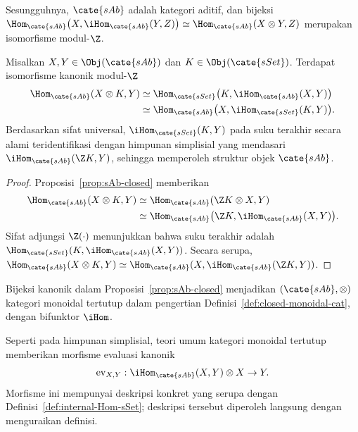 Sesungguhnya, $\cate{sAb}$ adalah kategori aditif, dan bijeksi
$\Hom_{\cate{sAb}}\bigl(X,\iHom_{\cate{sAb}}(Y,Z)\bigr)
\simeq\Hom_{\cate{sAb}}(X\otimes Y,Z)$ merupakan isomorfisme modul-$\Z$.

\begin{corollary}
	Misalkan $X,Y\in\Obj(\cate{sAb})$ dan $K\in\Obj(\cate{sSet})$. Terdapat
	isomorfisme kanonik modul-$\Z$
	\begin{align*}
		\Hom_{\cate{sAb}}(X\otimes K,Y)
		&\simeq\Hom_{\cate{sSet}}
		\bigl(K,\iHom_{\cate{sAb}}(X,Y)\bigr)\\
		&\simeq\Hom_{\cate{sAb}}
		\bigl(X,\iHom_{\cate{sSet}}(K,Y)\bigr).
	\end{align*}
	Berdasarkan sifat universal, $\iHom_{\cate{sSet}}(K,Y)$ pada suku terakhir
	secara alami teridentifikasi dengan himpunan simplisial yang mendasari
	$\iHom_{\cate{sAb}}(\Z K,Y)$, sehingga memperoleh
	struktur objek $\cate{sAb}$.
\end{corollary}
\begin{proof}
	Proposisi~\ref{prop:sAb-closed} memberikan
	\begin{align*}
		\Hom_{\cate{sAb}}(X\otimes K,Y)
		&\simeq\Hom_{\cate{sAb}}(\Z K\otimes X,Y)\\
		&\simeq\Hom_{\cate{sAb}}
		\bigl(\Z K,\iHom_{\cate{sAb}}(X,Y)\bigr).
	\end{align*}
	Sifat adjungsi $\Z(\cdot)$ menunjukkan bahwa suku terakhir adalah
	$\Hom_{\cate{sSet}}(K,\iHom_{\cate{sAb}}(X,Y))$. Secara serupa,
	$\Hom_{\cate{sAb}}(X\otimes K,Y)\simeq
	\Hom_{\cate{sAb}}(X,\iHom_{\cate{sAb}}(\Z K,Y))$.
\end{proof}

\begin{corollary}
	Bijeksi kanonik dalam Proposisi~\ref{prop:sAb-closed} menjadikan
	$(\cate{sAb},\otimes)$ kategori monoidal tertutup dalam pengertian
	Definisi~\ref{def:closed-monoidal-cat}, dengan bifunktor $\iHom$.
\end{corollary}

Seperti pada himpunan simplisial, teori umum kategori monoidal tertutup
memberikan morfisme evaluasi kanonik
\[
\mathrm{ev}_{X,Y}:\iHom_{\cate{sAb}}(X,Y)\otimes X\to Y.
\]
Morfisme ini mempunyai deskripsi konkret yang serupa dengan
Definisi~\ref{def:internal-Hom-sSet}; deskripsi tersebut diperoleh langsung
dengan menguraikan definisi.

